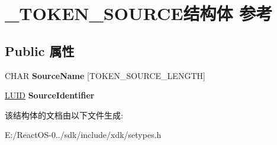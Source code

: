 \hypertarget{struct___t_o_k_e_n___s_o_u_r_c_e}{}\section{\+\_\+\+T\+O\+K\+E\+N\+\_\+\+S\+O\+U\+R\+C\+E结构体 参考}
\label{struct___t_o_k_e_n___s_o_u_r_c_e}
\subsection*{Public 属性}
\begin{DoxyCompactItemize}
\item 
\mbox{\label{struct___t_o_k_e_n___s_o_u_r_c_e_a1c5e2ef31243f1792012a60bb68a8a44}} 
C\+H\+AR {\bfseries Source\+Name} \mbox{[}T\+O\+K\+E\+N\+\_\+\+S\+O\+U\+R\+C\+E\+\_\+\+L\+E\+N\+G\+TH\mbox{]}
\item 
\mbox{\label{struct___t_o_k_e_n___s_o_u_r_c_e_a4d57e43c978eece83e875b666c5940e9}} 
\hyperlink{struct___l_u_i_d}{L\+U\+ID} {\bfseries Source\+Identifier}
\end{DoxyCompactItemize}


该结构体的文档由以下文件生成\+:\begin{DoxyCompactItemize}
\item 
E\+:/\+React\+O\+S-\/0../sdk/include/xdk/setypes.\+h\end{DoxyCompactItemize}

